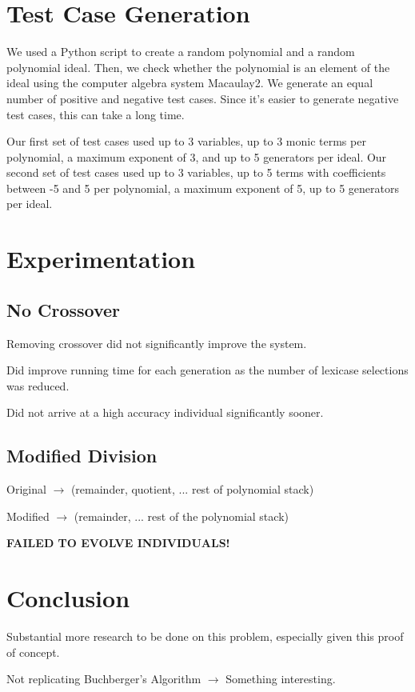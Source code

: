 \documentclass[20pt]{extarticle}
\begin{document}
\newpage
\section*{Test Case Generation}

We used a Python script to create a random polynomial and a random polynomial ideal.
Then, we check whether the polynomial is an element of the ideal using the computer algebra system Macaulay2.
We generate an equal number of positive and negative test cases.
Since it's easier to generate negative test cases, this can take a long time.

Our first set of test cases used up to 3 variables, up to 3 monic terms per polynomial, a maximum exponent of 3, and up to 5 generators per ideal.
Our second set of test cases used up to 3 variables, up to 5 terms with coefficients between -5 and 5 per polynomial, a maximum exponent of 5, up to 5 generators per ideal.

\newpage
\section*{Experimentation}
\subsection*{No Crossover}

Removing crossover did not significantly improve the system.

Did improve running time for each generation as the number of lexicase selections was reduced. 

Did not arrive at a high accuracy individual significantly sooner.

\subsection*{Modified Division}

\noindent Original $\rightarrow$ (remainder, quotient, ... rest of polynomial stack)

\noindent Modified $\rightarrow$ (remainder, ... rest of the polynomial stack)

\noindent \textbf{FAILED TO EVOLVE INDIVIDUALS!}


\newpage
\section*{Conclusion}

Substantial more research to be done on this problem, especially given this proof of concept.

Not replicating Buchberger's Algorithm $\rightarrow$ Something interesting.
\end{document}
